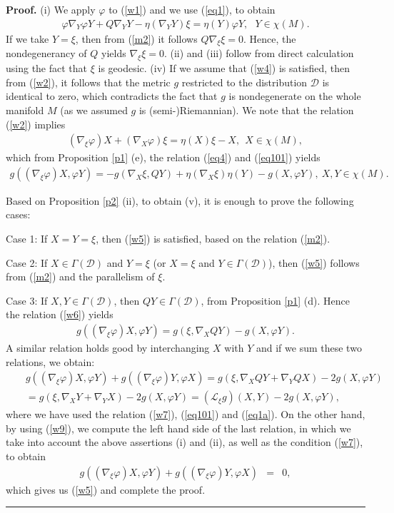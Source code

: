 \documentclass[10pt,a4paper]{amsart}
\newenvironment{proof}[1][Proof]{\noindent\textbf{#1.} }{\ \rule{0.5em}{0.5em}}
\begin{document}
\begin{proof}
(i)	We apply $\varphi$ to (\ref{w1}) and we use (\ref{eq1}), to obtain 
	\begin{eqnarray}
		\varphi\nabla_Y\varphi Y+Q\nabla_YY-\eta(\nabla_YY)\xi=\eta(Y)\varphi Y, \ \ \ Y\in\chi(M).     \nonumber
		\end{eqnarray}
	If we take $Y=\xi$, then from (\ref{m2}) it follows $Q\nabla_{\xi}\xi=0$. Hence, the nondegenerancy of $Q$ yields $\nabla_{\xi}\xi=0$. (ii) and (iii) follow from direct calculation using the fact that $\xi$ is geodesic. (iv) If we assume that (\ref{w4}) is satisfied, then from (\ref{w2}), it follows that the metric $g$ restricted to the distribution $\mathcal{D}$ is identical to zero, which contradicts the fact that $g$ is nondegenerate on the whole manifold $M$ (as we assumed $g$ is (semi-)Riemannian). We note that the relation (\ref{w2}) implies 
	\begin{eqnarray}
		(\nabla_{\xi}\varphi)X+(\nabla_X\varphi)\xi=\eta(X)\xi-X, \ \  X\in\chi(M), \label{w8}
	\end{eqnarray}
	which from Proposition \ref{p1} (e), the relation (\ref{eq4}) and (\ref{eq101}) yields
	\begin{eqnarray}
		g((\nabla_{\xi}\varphi)X,\varphi Y)=-g(\nabla_X\xi,QY)+ \eta(\nabla_X\xi)\eta(Y)-g(X,\varphi Y), \ X,Y\in\chi(M). \label{w6}
	\end{eqnarray}	
	
	Based on Proposition \ref{p2} (ii),  to obtain (v), it is enough to prove the following cases:\smallskip
	
	\noindent Case 1: If  $X=Y=\xi$, then (\ref{w5}) is satisfied, based on the relation (\ref{m2}).\smallskip
	
	\noindent Case 2: If $X\in\Gamma(\mathcal{D})$ and $Y=\xi$ (or $X=\xi$ and $Y\in\Gamma(\mathcal{D})$), then (\ref{w5}) follows from (\ref{m2}) and the parallelism of $\xi$. \smallskip
	
	\noindent Case 3: If $X,Y\in\Gamma(\mathcal{D})$, then $QY\in\Gamma(\mathcal{D})$, from Proposition \ref{p1} (d). Hence the relation (\ref{w6}) yields 
\begin{eqnarray*}
		g((\nabla_{\xi}\varphi)X,\varphi Y)=g(\xi,\nabla_XQY)-g(X,\varphi Y).
\end{eqnarray*}
A similar relation holds good by interchanging $X$ with $Y$ and if we sum these two relations, we obtain:
\begin{eqnarray*}
		&&g((\nabla_{\xi}\varphi)X,\varphi Y)+g((\nabla_{\xi}\varphi)Y,\varphi X)=g(\xi,\nabla_XQY+\nabla_YQX)-2g(X,\varphi Y)\\
		&&=g(\xi,\nabla_XY+\nabla_YX)-2g(X,\varphi Y)=(\mathcal{L}_{\xi}g)(X,Y)-2g(X,\varphi Y),
\end{eqnarray*}	
where we have used the relation	(\ref{w7}), (\ref{eq101}) and (\ref{eq1a}). On the other hand, by using (\ref{w9}), we compute the left hand side of the last relation, in which we take into account the above assertions (i) and (ii), as well as the condition (\ref{w7}), to obtain 
\begin{eqnarray*}
	g((\nabla_{\xi}\varphi)X,\varphi Y)+g((\nabla_{\xi}\varphi)Y,\varphi X)&=& 0,
\end{eqnarray*}
which gives us (\ref{w5}) and complete the proof.
\end{proof}
\end{document}
